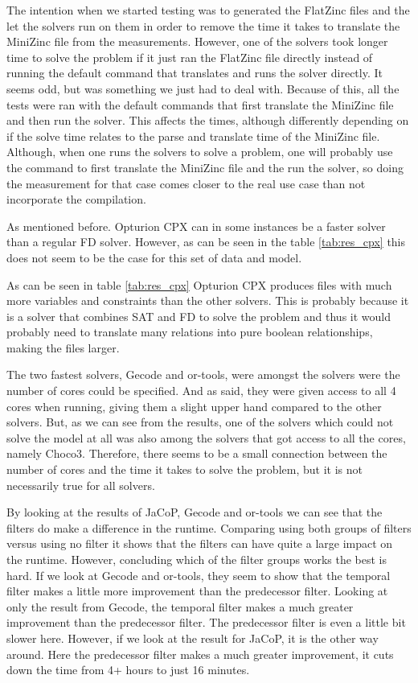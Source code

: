 The intention when we started testing was to generated the FlatZinc files and the let the solvers run on them in order to remove the time it takes to translate the MiniZinc file from the measurements. However, one of the solvers took longer time to solve the problem if it just ran the FlatZinc file directly instead of running the default command that translates and runs the solver directly. It seems odd, but was something we just had to deal with. Because of this, all the tests were ran with the default commands that first translate the MiniZinc file and then run the solver. This affects the times, although differently depending on if the solve time relates to the parse and translate time of the MiniZinc file. Although, when one runs the solvers to solve a problem, one will probably use the command to first translate the MiniZinc file and the run the solver, so doing the measurement for that case comes closer to the real use case than not incorporate the compilation.

As mentioned before. Opturion CPX can in some instances be a faster solver than a regular FD solver. However, as can be seen in the table \ref{tab:res_cpx} this does not seem to be the case for this set of data and model.

As can be seen in table \ref{tab:res_cpx} Opturion CPX produces files with much more variables and constraints than the other solvers. This is probably because it is a solver that combines SAT and FD to solve the problem and thus it would probably need to translate many relations into pure boolean relationships, making the files larger.

The two fastest solvers, Gecode and or-tools, were amongst the solvers were the number of cores could be specified. And as said, they were given access to all 4 cores when running, giving them a slight upper hand compared to the other solvers. But, as we can see from the results, one of the solvers which could not solve the model at all was also among the solvers that got access to all the cores, namely Choco3. Therefore, there seems to be a small connection between the number of cores and the time it takes to solve the problem, but it is not necessarily true for all solvers.

By looking at the results of JaCoP, Gecode and or-tools we can see that the filters do make a difference in the runtime. Comparing using both groups of filters versus using no filter it shows that the filters can have quite a large impact on the runtime. However, concluding which of the filter groups works the best is hard. If we look at Gecode and or-tools, they seem to show that the temporal filter makes a little more improvement than the predecessor filter. Looking at only the result from Gecode, the temporal filter makes a much greater improvement than the predecessor filter. The predecessor filter is even a little bit slower here. However, if we look at the result for JaCoP, it is the other way around. Here the predecessor filter makes a much greater improvement, it cuts down the time from 4+ hours to just 16 minutes.


